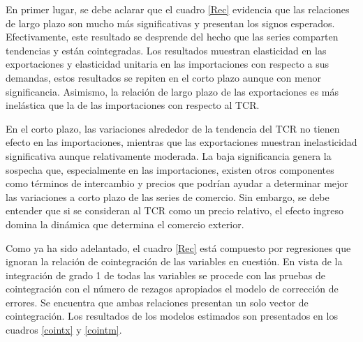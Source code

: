 \documentclass[12pt,letterpaper]{article}
\begin{document}
En primer lugar, se debe aclarar que el cuadro \ref{Rec} evidencia que las relaciones de largo plazo son mucho más significativas y presentan los signos esperados. Efectivamente, este resultado se desprende del hecho que las series comparten tendencias y están cointegradas. Los resultados muestran elasticidad en las exportaciones y elasticidad unitaria en las importaciones con respecto a sus demandas, estos resultados se repiten en el corto plazo aunque con menor significancia. Asimismo, la relación de largo plazo de las exportaciones es más inelástica que la de las importaciones con respecto al TCR.

En el corto plazo, las variaciones alrededor de la tendencia del TCR no tienen efecto en las importaciones, mientras que las exportaciones muestran inelasticidad significativa aunque relativamente moderada. La baja significancia genera la sospecha que, especialmente en las importaciones, existen otros componentes como términos de intercambio y precios que podrían ayudar a determinar mejor las variaciones a corto plazo de las series de comercio. Sin embargo, se debe entender que si se consideran al TCR como un precio relativo, el efecto ingreso domina la dinámica que determina el comercio exterior.

Como ya ha sido adelantado, el cuadro \ref{Rec} está compuesto por regresiones que ignoran la relación de cointegración de las variables en cuestión. En vista de la integración de grado 1 de todas las variables se procede con las pruebas de cointegración con el número de rezagos apropiados el modelo de corrección de errores. Se encuentra que ambas relaciones presentan un solo vector de cointegración. Los resultados de los modelos estimados son presentados en los cuadros \ref{cointx} y \ref{cointm}.
\end{document}
